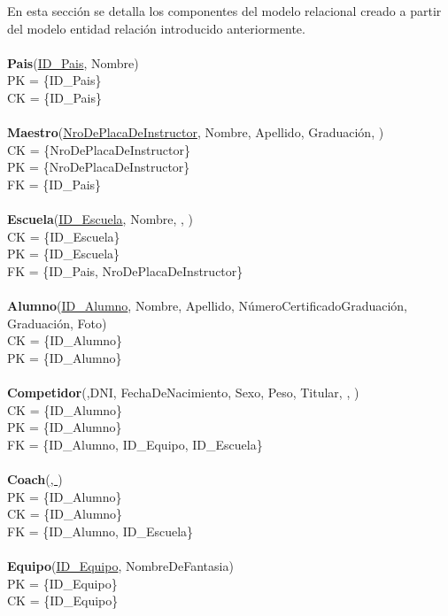 En esta sección se detalla los componentes del modelo relacional creado a partir del modelo entidad relación introducido anteriormente.\\
\\
\textbf{Pais}(\uline{ID\_Pais}, Nombre)\\
PK = \{ID\_Pais\}\\
CK = \{ID\_Pais\}\\
\\
\textbf{Maestro}(\uline{NroDePlacaDeInstructor}, Nombre, Apellido, Graduación, )\\
CK = \{NroDePlacaDeInstructor\}\\
PK = \{NroDePlacaDeInstructor\}\\
FK = \{ID\_Pais\}\\
\\
\textbf{Escuela}(\uline{ID\_Escuela}, Nombre, , )\\
CK = \{ID\_Escuela\}\\
PK = \{ID\_Escuela\}\\
FK = \{ID\_Pais, NroDePlacaDeInstructor\}\\
\\
\textbf{Alumno}(\uline{ID\_Alumno}, Nombre, Apellido, NúmeroCertificadoGraduación, Graduación, Foto)\\
CK = \{ID\_Alumno\}\\
PK = \{ID\_Alumno\}\\
\\
\textbf{Competidor}(\uline{},DNI, FechaDeNacimiento, Sexo, Peso, Titular, , )\\
CK = \{ID\_Alumno\}\\
PK = \{ID\_Alumno\}\\
FK = \{ID\_Alumno, ID\_Equipo, ID\_Escuela\}\\
\\
\textbf{Coach}(\uline{, })\\
PK = \{ID\_Alumno\}\\
CK = \{ID\_Alumno\}\\
FK = \{ID\_Alumno, ID\_Escuela\}\\
\\
\textbf{Equipo}(\uline{ID\_Equipo}, NombreDeFantasia)\\
PK = \{ID\_Equipo\}\\
CK = \{ID\_Equipo\}\\
\\
